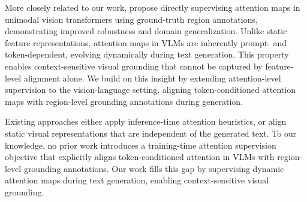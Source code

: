 More closely related to our work, \citet{chefer2022optimizing} propose directly supervising attention maps in unimodal vision transformers using ground-truth region annotations, demonstrating improved robustness and domain generalization. Unlike static feature representations, attention maps in VLMs are inherently prompt- and token-dependent, evolving dynamically during text generation. This property enables context-sensitive visual grounding that cannot be captured by feature-level alignment alone. We build on this insight by extending attention-level supervision to the vision-language setting, aligning token-conditioned attention maps with region-level grounding annotations during generation.

Existing approaches either apply inference-time attention heuristics, or align static visual representations that are independent of the generated text. To our knowledge, no prior work introduces a training-time attention supervision objective that explicitly aligns token-conditioned attention in VLMs with region-level grounding annotations. Our work fills this gap by supervising dynamic attention maps during text generation, enabling context-sensitive visual grounding.

